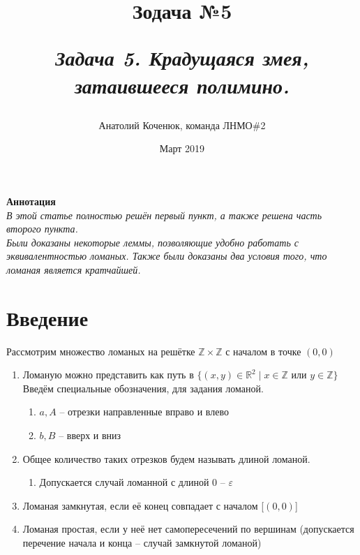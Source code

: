 \documentclass[12pt,a4paper, flushleft]{article}
\author{Анатолий Коченюк, команда ЛНМО\#2}
\date{Март 2019}
\title{Зодача \textsuperscript{\textregistered} №5}
\title{
	\vspace{4cm}	
	\horline{380}	
	\begin{center}
		\begin{Huge}
			\textbf{\emph{Задача 5. Крадущаяся змея, затаившееся полимино.}}
		\end{Huge}
	\end{center}	
	\vspace{-1.3cm}	
	\horline{400}
}
\begin{document}
\maketitle
\vspace{4cm}
	
	\begin{myquote}
	\begin{center}
		\textbf{Аннотация}\\
		\textit{
			В этой статье полностью решён первый пункт, а также решена часть второго пункта.\\
			Были доказаны некоторые леммы, позволяющие удобно работать с эквивалентностью ломаных.
			Также были доказаны два условия того, что ломаная является кратчайшей.
		}
	\end{center}
	\end{myquote}	
	
	\pagebreak

	\tableofcontents	
	
	\pagebreak

\section*{Введение}

Рассмотрим множество ломаных на решётке $\mathds{Z}\times \mathds{Z}$ с началом в точке $(0, 0)$

\begin{enumerate}
	\item Ломаную можно представить как путь в $\{(x, y)\in\mathds{R}^2\mid x\in \mathds{Z} \text{ или } y\in\mathds{Z}\}$
	Введём специальные обозначения, для задания ломаной.
	\begin{enumerate}
		\item[] $a, A$ -- отрезки направленные вправо и влево
		\item[] $b, B$ -- вверх и вниз
	\end{enumerate}
	\item Общее количество таких отрезков будем называть длиной ломаной.
	\begin{enumerate}
		\item []Допускается случай ломанной с длиной 0 -- $\varepsilon$
	\end{enumerate}
	\item Ломаная замкнутая, если её конец совпадает с началом [$(0, 0)$]
	\item Ломаная простая, если у неё нет самопересечений по вершинам (допускается перечение начала и конца -- случай замкнутой ломаной)	
\end{enumerate}
\end{document}
